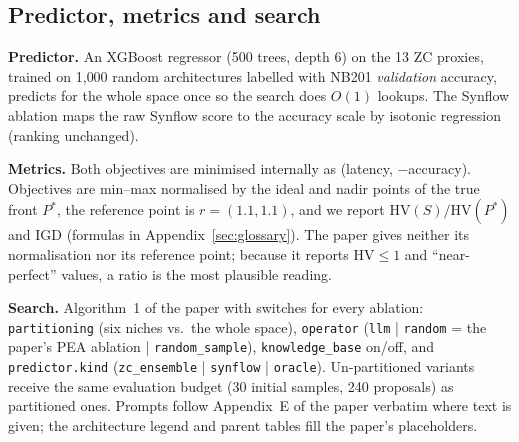\documentclass[11pt,a4paper]{article}
\newcommand{\code}[1]{\texttt{#1}}
\newcommand{\HV}{\mathrm{HV}}
\begin{document}
\subsection{Predictor, metrics and search}
\textbf{Predictor.} An XGBoost regressor (500 trees, depth 6) on the 13 ZC proxies, trained on 1{,}000 random architectures labelled with NB201 \emph{validation} accuracy, predicts for the whole space once so the search does $O(1)$ lookups. The Synflow ablation maps the raw Synflow score to the accuracy scale by isotonic regression (ranking unchanged).

\noindent\textbf{Metrics.} Both objectives are minimised internally as (latency, $-$accuracy). Objectives are min--max normalised by the ideal and nadir points of the true front $P^\ast$, the reference point is $r=(1.1,1.1)$, and we report $\HV(S)/\HV(P^\ast)$ and IGD (formulas in Appendix~\ref{sec:glossary}). The paper gives neither its normalisation nor its reference point; because it reports $\HV\le1$ and ``near-perfect'' values, a ratio is the most plausible reading.

\noindent\textbf{Search.} Algorithm~1 of the paper with switches for every ablation: \code{partitioning} (six niches vs.\ the whole space), \code{operator} (\code{llm} | \code{random} = the paper's PEA ablation | \code{random\_sample}), \code{knowledge\_base} on/off, and \code{predictor.kind} (\code{zc\_ensemble} | \code{synflow} | \code{oracle}). Un-partitioned variants receive the same evaluation budget (30 initial samples, 240 proposals) as partitioned ones. Prompts follow Appendix~E of the paper verbatim where text is given; the architecture legend and parent tables fill the paper's placeholders.
\end{document}

